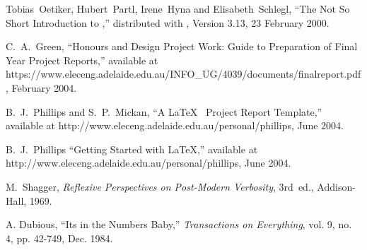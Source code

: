 

 Tobias~Oetiker, Hubert~Partl, Irene~Hyna and
Elisabeth~Schlegl, ``The Not So Short Introduction to \LaTeXe,''
distributed with \LaTeXe, Version 3.13, 23 February 2000.

 C.~A.~Green, ``Honours and Design Project Work:
Guide to Preparation of Final Year Project Reports,'' available at
https://www.eleceng.adelaide.edu.au/INFO\_UG/4039/documents/finalreport.pdf,
February 2004.

 B.~J.~Phillips and S.~P.~Mickan, ``A \LaTeX~
Project Report Template,'' available at
http://www.eleceng.adelaide.edu.au/personal/phillips, June 2004.

 B.~J.~Phillips ``Getting Started with \LaTeX,''
available at http://www.eleceng.adelaide.edu.au/personal/phillips,
June 2004.

 M.~Shagger, \emph{Reflexive Perspectives on
  Post-Modern Verbosity}, 3rd~ed., Addison-Hall, 1969.

 A. Dubious, ``Its in the Numbers Baby,''
\emph{Transactions on Everything}, vol. 9, no. 4, pp. 42-749,
Dec. 1984.



